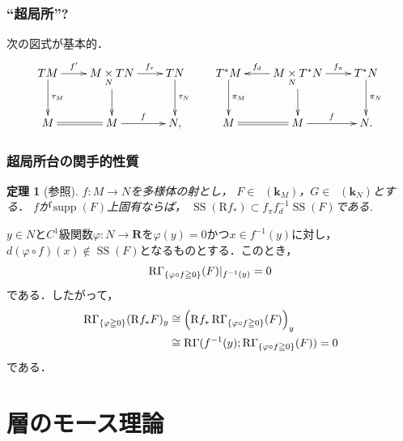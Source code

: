 \documentclass[dvipdfmx,10pt,aspectratio=169,leqno]{beamer}%
\makeatletter
\newcommand{\rr}{\mathbf{R}}
\newcommand{\kk}{\mathbf{k}}
\renewenvironment{proof}[1][\proofname]{\par
  \pushQED{\qed}%
  \normalfont \topsep6\p@\@plus6\p@\relax
  \trivlist
  \item[\hskip\labelsep
         \bfseries
    {#1}]\ignorespaces
}{%
  \popQED\endtrivlist\@endpefalse
}
\renewcommand{\proofname}{\textrm{Proof.}}
\numberwithin{equation}{subsection}
\newcommand{\supp}{\mathop{\mathrm{supp}}\nolimits}
\newcommand{\Dompb}{\mathop{\mathsf{D}^\mathrm{b}}\nolimits}
\newcommand{\muS}{\mathop{\mathrm{SS}}\nolimits}
\newcommand{\RG}{\mathop{\mathrm{R}\hspace{-0pt}\Gamma}\nolimits}
\newcommand{\Rder}{\mathrm{R}}
\newcommand{\mpb}[1][]{{#1}_{\pi}} %
\newcommand{\mdiff}[1][]{{#1}_{d}} %
\newcommand{\mptan}[1][]{{#1}_{\tau}} %
\newcommand{\cotb}[1][]{T^{\ast}{#1}}
\newcommand{\pb}[1][]{\mathbin{\mathop{\times}\limits_{#1}}}
\theoremstyle{mystyle}
\newtheorem{THM}[AXM]{定理}
\makeatother
\begin{document}
\begin{frame}\frametitle{``超局所''?}
    次の図式が基本的．
    \[\vcenter{\xymatrix@C=22pt@R=26pt{
        TM
        \ar[d]^-{\tau_M}
        \ar[r]^-{f'}
        &
        M\pb[N] TN
        \ar[d]_-{}
        \ar[r]^-{\mptan[f]}
        &
        TN
        \ar[d]^-{\tau_N}
        &
        \cotb[M]
        \ar[d]^-{\pi_M}
        &
        M\pb[N] \cotb[N]
        \ar[d]_-{}
        \ar[r]^-{\mpb[f]}
        \ar[l]_-{\mdiff[f]}
        &
        \cotb[N]
        \ar[d]^-{\pi_N}
        \\
        M
        \ar@{=}[r]
        &
        M
        \ar[r]^-{f}
        &
        N,
        &
        M
        \ar@{=}[r]
        &
        M
        \ar[r]^-{f}
        &
        N.
    }}\]
\end{frame}
\begin{frame}
    \frametitle{超局所台の関手的性質}
    \begin{THM}[{\cite[5.4節]{KS90}}参照]\label{thm15}
        \(f\colon M\to N\)を多様体の射とし，
        \(F\in\Dompb(\kk_M)\)，\(G\in\Dompb(\kk_N)\)とする．
        \(f\)が\(\supp(F)\)上固有ならば，
        \(
            \muS(\Rder{f_{\ast}})
            \subset
            \mpb[f]\mdiff[f]^{-1}\muS(F)
        \)である.\label{item15-1}
    \end{THM}
    \begin{proof}[証明. ]
        \(y\in N\)と\(C^1\)級関数\(
            \varphi\colon N\to \rr
        \)を\(\varphi(y)=0\)かつ\(x\in f^{-1}(y)\)に対し，\(
            d(\varphi\circ f)(x)\notin \muS(F)
        \)となるものとする．このとき，
        \[
            \RG_{\{\varphi\circ f\geqq0\}}(F)|_{f^{-1}(y)}=0
        \]
        である．したがって，
        \begin{align*}
            \RG_{\{\varphi\geqq0\}}(\Rder{f_{\ast}}F)_{y}
            &\cong
            \left(\Rder{f_{\ast}}\RG_{\{\varphi\circ f\geqq0\}}(F)\right)_{y}\\
            &\cong
            \RG(f^{-1}(y);\RG_{\{\varphi\circ f\geqq0\}}(F))=0
        \end{align*}
        である．
    \end{proof}
\end{frame}

\section{層のモース理論}
\end{document}
